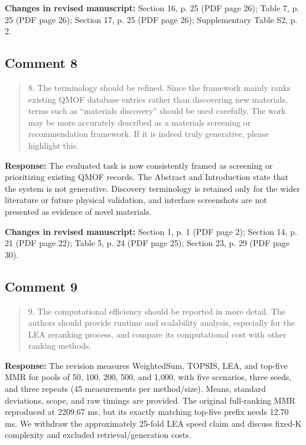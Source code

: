 \documentclass[11pt,a4paper]{article}
\begin{document}
\textbf{Changes in revised manuscript:} Section 16, p. 25 (PDF page 26); Table 7, p. 25 (PDF page 26); Section 17, p. 25 (PDF page 26); Supplementary Table S2, p. 2.

\subsection*{Comment 8}
\begin{quote}\small 8. The terminology should be refined. Since the framework mainly ranks existing QMOF database entries rather than discovering new materials, terms such as ``materials discovery'' should be used carefully. The work may be more accurately described as a materials screening or recommendation framework. If it is indeed truly generative, please highlight this.\end{quote}
\textbf{Response:} The evaluated task is now consistently framed as screening or prioritizing existing QMOF records. The Abstract and Introduction state that the system is not generative. Discovery terminology is retained only for the wider literature or future physical validation, and interface screenshots are not presented as evidence of novel materials.

\textbf{Changes in revised manuscript:} Section 1, p. 1 (PDF page 2); Section 14, p. 21 (PDF page 22); Table 5, p. 24 (PDF page 25); Section 23, p. 29 (PDF page 30).

\subsection*{Comment 9}
\begin{quote}\small 9. The computational efficiency should be reported in more detail. The authors should provide runtime and scalability analysis, especially for the LEA reranking process, and compare its computational cost with other ranking methods.\end{quote}
\textbf{Response:} The revision measures WeightedSum, TOPSIS, LEA, and top-five MMR for pools of 50, 100, 200, 500, and 1,000, with five scenarios, three seeds, and three repeats (45 measurements per method/size). Means, standard deviations, scope, and raw timings are provided. The original full-ranking MMR reproduced at 2209.67 ms, but its exactly matching top-five prefix needs 12.70 ms. We withdraw the approximately 25-fold LEA speed claim and discuss fixed-K complexity and excluded retrieval/generation costs.
\end{document}

